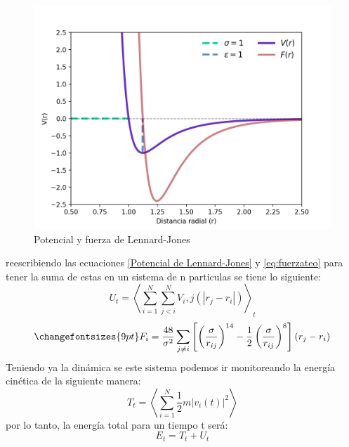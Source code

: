 \documentclass[reprint,amsmath,amssymb,aps,]{revtex4-2}
\begin{document}
\begin{figure}[H]
    \centering
    \includegraphics[scale=0.45]{../Graphics/Potencial.png}
    \caption{Potencial y fuerza de Lennard-Jones}
    \label{pot-len-jones}
\end{figure}
reescribiendo las ecuaciones \ref{Potencial de Lennard-Jones} y \ref{eq:fuerzateo} para tener la suma de estas en un sistema de n particulas se tiene lo siguiente:
\begin{equation}
    \label{eq:pot-n}
    U_t=\left\langle\sum_{i=1}^N \sum_{j<i}^N V_i,j(|r_j-r_i|)\right\rangle_t
\end{equation}
\begin{equation}
    \changefontsizes{9pt}
    \label{eq:f-n}
    F_i = \frac{48}{\sigma^2} \sum_{j \ne i} \left[\left(\frac{\sigma}{r_{ij}}\right)^{14}-\frac{1}{2}\left(\frac{\sigma}{r_{ij}} \right)^8  \right] (r_j-r_i)
\end{equation}
Teniendo ya la dinámica se este sistema podemos ir monitoreando la energía cinética de la siguiente manera:
\begin{equation}
    \label{eq:kin-n}
    T_t=\left\langle \sum_{i=1}^N \frac{1}{2}m|v_i(t)|^2\right\rangle
\end{equation}
por lo tanto, la energía total para un tiempo t será:
\begin{equation}
    \label{eq:e-tot}
    E_t=T_t+U_t
\end{equation}
\end{document}
